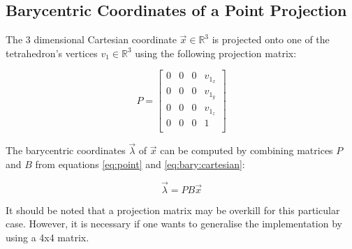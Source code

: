 \subsection{Barycentric Coordinates of a Point Projection}

The  3  dimensional Cartesian coordinate $\vec{x}\in\mathbb{R}^3$  is  projected
onto  one  of  the  tetrahedron's  vertices  $v_1 \in  \mathbb{R}^3$  using  the
following projection matrix:

\begin{equation}
    \label{eq:point}
    P = \begin{bmatrix}
        0 & 0 & 0 & v_{1_x} \\
        0 & 0 & 0 & v_{1_y} \\
        0 & 0 & 0 & v_{1_z} \\
        0 & 0 & 0 & 1 \\
    \end{bmatrix}
\end{equation}

The barycentric coordinates $\vec{\lambda}$  of  $\vec{x}$  can  be  computed by
combining   matrices   $P$   and   $B$   from   equations   \ref{eq:point}   and
\ref{eq:bary:cartesian}:

\begin{equation}
    \vec{\lambda} = PB\vec{x}
\end{equation}

It should be noted that a projection  matrix may be overkill for this particular
case. However, it is necessary if one wants to generalise  the implementation by
using a 4x4 matrix.

